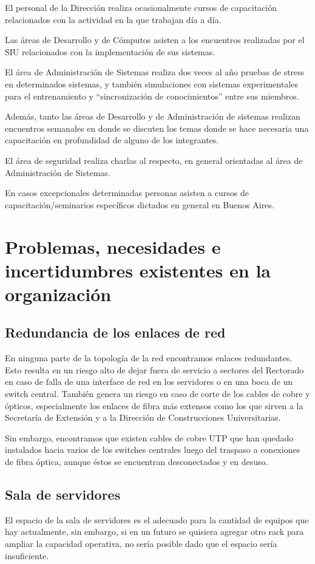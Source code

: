 \documentclass[a4paper,11pt,oneside]{article}
\begin{document}
El personal de la Dirección realiza ocasionalmente cursos de
capacitación relacionados con la actividad en la que trabajan día a
día.

Las áreas de Desarrollo y de Cómputos asisten a los encuentros
realizadas por el SIU relacionados con la implementación de sus
sistemas.

El área de Administración de Sistemas realiza dos veces al año pruebas
de stress en determinados sistemas, y también simulaciones con
sistemas experimentales para el entrenamiento y ``sincronización de
conocimientos'' entre sus miembros.

Además, tanto las áreas de Desarrollo y de Administración de sistemas
realizan encuentros semanales en donde se discuten los temas donde se
hace necesaria una capacitación en profundidad de alguno de los
integrantes.

El área de seguridad realiza charlas al respecto, en general
orientadas al área de Administración de Sistemas.

En casos excepcionales determinadas personas asisten a cursos de
capacitación/seminarios específicos dictados en general en Buenos
Aires.
%
\section{Problemas, necesidades e incertidumbres existentes en la organización}
%
\subsection*{Redundancia de los enlaces de red}
En ninguna parte de la topología de la red encontramos enlaces
redundantes. Esto resulta en un riesgo alto de dejar fuera de servicio
a sectores del Rectorado en caso de falla de una interface de red en
los servidores o en una boca de un switch central. También genera un
riesgo en caso de corte de los cables de cobre y ópticos,
especialmente los enlaces de fibra más extensos como los que sirven a
la Secretaría de Extensión y a la Dirección de Construcciones
Universitarias.

Sin embargo, encontramos que existen cables de cobre UTP que han quedado instalados
hacia varios de los switches centrales luego del traspaso a conexiones de fibra óptica,
aunque éstos se encuentran desconectados y en desuso.
%
\subsection*{Sala de servidores}
El espacio de la sala de servidores es el adecuado para la cantidad de
equipos que hay actualmente, sin embargo, si en un futuro se quisiera
agregar otro rack para ampliar la capacidad operativa, no sería
posible dado que el espacio sería insuficiente.
\end{document}
